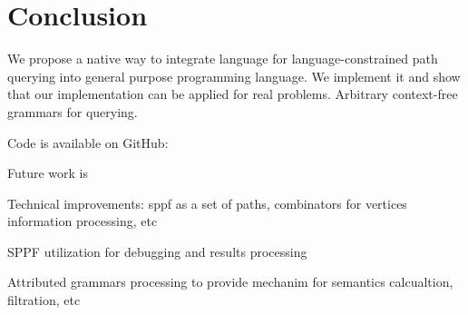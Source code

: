 \section{Conclusion}

We propose a native way to integrate language for language-constrained path querying into general purpose programming language.
We implement it and show that our implementation can be applied for real  problems.
Arbitrary context-free grammars for querying.

Code is available on GitHub: 

Future work is

Technical improvements: sppf as a set of paths, combinators for vertices information processing, etc

SPPF utilization for debugging and results processing

Attributed grammars processing to provide mechanim for semantics calcualtion, filtration, etc   